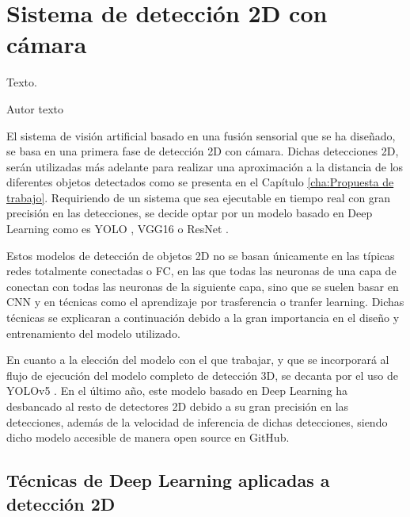 \chapter{Sistema de detección 2D con cámara}
\label{cha:Sistema de detección 2D con cámara}

\begin{FraseCelebre}
  \begin{Frase}
    Texto.
  \end{Frase}
  \begin{Fuente}
    Autor texto
  \end{Fuente}
\end{FraseCelebre}

\noindent
El sistema de visión artificial basado en una fusión sensorial que se ha diseñado, se basa en una primera fase de detección 2D con cámara. Dichas detecciones 2D, serán utilizadas más adelante para realizar una aproximación a la distancia de los diferentes objetos detectados como se presenta en el Capítulo \ref{cha:Propuesta de trabajo}. Requiriendo de un sistema que sea ejecutable en tiempo real con gran precisión en las detecciones, se decide optar por un modelo basado en Deep Learning como es YOLO \cite{YOLOv4}, VGG16 \cite{VGG16} o ResNet \cite{ResNet}.

Estos modelos de detección de objetos 2D no se basan únicamente en las típicas redes totalmente conectadas o \ac{FC}, en las que todas las neuronas de una capa de conectan con todas las neuronas de la siguiente capa, sino que se suelen basar en \ac{CNN} y en técnicas como el aprendizaje por trasferencia o tranfer learning. Dichas técnicas se explicaran a continuación debido a la gran importancia en el diseño y entrenamiento del modelo utilizado.

En cuanto a la elección del modelo con el que trabajar, y que se incorporará al flujo de ejecución del modelo completo de detección 3D, se decanta por el uso de YOLOv5 \cite{YOLOv5}. En el último año, este modelo basado en Deep Learning ha desbancado al resto de detectores 2D debido a su gran precisión en las detecciones, además de la velocidad de inferencia de dichas detecciones, siendo dicho modelo accesible de manera open source en GitHub.

\section{Técnicas de Deep Learning aplicadas a detección 2D}
\label{sec:Técnicas de Deep Learning aplicadas a detección 2D}

